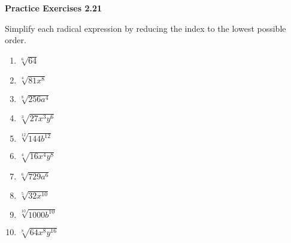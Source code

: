 \vspace{1ex}
\noindent\textbf{Practice Exercises 2.21}

\vspace{0.75ex}

Simplify each radical expression by reducing the index to the lowest possible order.

\begin{multicols}{2}
\begin{enumerate}[noitemsep, label = \color{blue}\arabic*. ]
    \item $\sqrt[{\scriptstyle 6}]{64}$
    \item $\sqrt[{\scriptstyle 4}]{81x^8}$
    \item $\sqrt[{\scriptstyle 8}]{256a^4}$
    \item $\sqrt[{\scriptstyle 3}]{27x^3y^6}$
    \item $\sqrt[{\scriptstyle 12}]{144b^{12}}$
    \item $\sqrt[{\scriptstyle 4}]{16x^4y^8}$
    \item $\sqrt[{\scriptstyle 6}]{729a^6}$
    \item $\sqrt[{\scriptstyle 5}]{32x^{10}}$
    \item $\sqrt[{\scriptstyle 10}]{1000b^{10}}$
    \item $\sqrt[{\scriptstyle 8}]{64x^8y^{16}}$
\end{enumerate}
\end{multicols}

